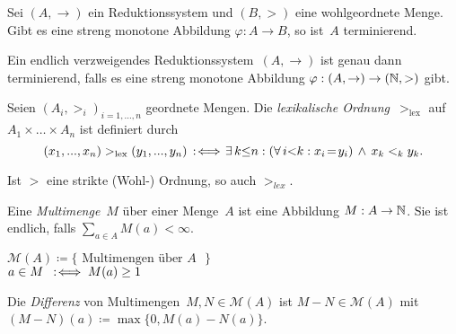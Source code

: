 \documentclass{cheat-sheet}
\newcommand{\Multisets}{\mathcal{M}} %
\begin{document}

\begin{lem}
  Sei $(A, {\to})$ ein Reduktionssystem und $(B, {>})$ eine wohlgeordnete Menge.
  Gibt es eine streng monotone Abbildung $\varphi : A \to B$, so ist~$A$ terminierend.
\end{lem}

\begin{lem}
  Ein endlich verzweigendes Reduktionssystem~$(A, {\to})$ ist genau dann terminierend, falls es eine streng monotone Abbildung $\varphi : (A, {\to}) \to (\mathbb{N}, >)$ gibt.
\end{lem}


\begin{defn}
  Seien $(A_i, >_i)_{i = 1, \ldots, n}$ geordnete Mengen.
  Die \emph{lexikalische Ordnung}~$>_{\text{lex}}$ auf $A_1 \times \ldots \times A_n$ ist definiert durch
  \[
    (x_1, \nldots, x_n) >_{\text{lex}} (y_1, \nldots, y_n) \!\!\coloniff\! \ex{k {\leq} n\!}\! (\fa{i {<} k\!}\! x_i \!=\! y_i) \,\wedge\, x_k <_k y_k.
  \]
\end{defn}

\begin{lem}
  Ist $>$ eine strikte (Wohl-) Ordnung, so auch $>_{\textit{lex}}$.
\end{lem}



\begin{defn}
  Eine \textit{Multimenge}~$M$ über einer Menge~$A$ ist eine Abbildung $M : A \to \mathbb{N}$.
  Sie ist endlich, falls ${\sum}_{a \in A} M(a) < \infty$.
\end{defn}

\begin{nota}
  \begin{minipage}[t]{0.8 \linewidth}
    $\Multisets(A) \coloneqq \{ \text{ Multimengen über $A$ } \}$ \\
    $a \in M \enspace:\!\iff M(a) \geq 1$
  \end{minipage}
\end{nota}

\begin{defn}
  Die \textit{Differenz} von Multimengen~$M, N \in \Multisets(A)$ ist $M - N \in \Multisets(A)$ mit
  $(M - N)(a) \coloneqq \max \{ 0, M(a) - N(a) \}$.
\end{defn}
\end{document}
